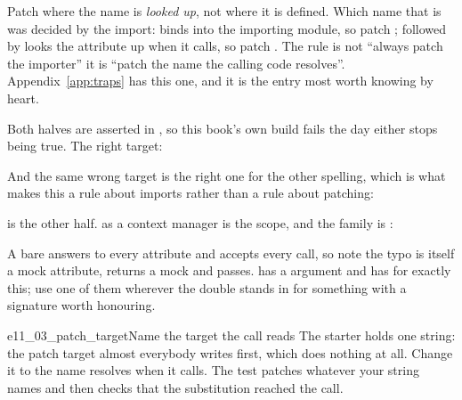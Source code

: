 \begin{trapbox}
Patch where the name is \emph{looked up}, not where it is defined. Which
name that is was decided by the import:  binds into
the importing module, so patch ;  followed
by  looks the attribute up when it calls, so patch .
The rule is not \enquote{always patch the importer} \dash{} it is
\enquote{patch the name the calling code resolves}. Appendix~\ref{app:traps}
has this one, and it is the entry most worth knowing by heart.
\end{trapbox}

\noindent
Both halves are asserted in , so this
book's own build fails the day either stops being true. The right target:


\noindent
And the same wrong target is the right one for the other spelling, which is
what makes this a rule about imports rather than a rule about patching:


\noindent
{} is the other half.  as a context manager is
the scope, and the  family is :


\begin{warning}
A bare  answers to every attribute and accepts every call, so
 \dash{} note the typo \dash{} is
itself a mock attribute, returns a mock and passes.  has a
 argument and  has  for exactly
this; use one of them wherever the double stands in for something with a
signature worth honouring.
\end{warning}

\begin{exercise}{e11_03_patch_target}{Name the target the call reads}
The starter holds one string: the patch target almost everybody writes
first, which does nothing at all. Change it to the name 
resolves when it calls. The test patches whatever your string names and then
checks that the substitution reached the call.
\end{exercise}

